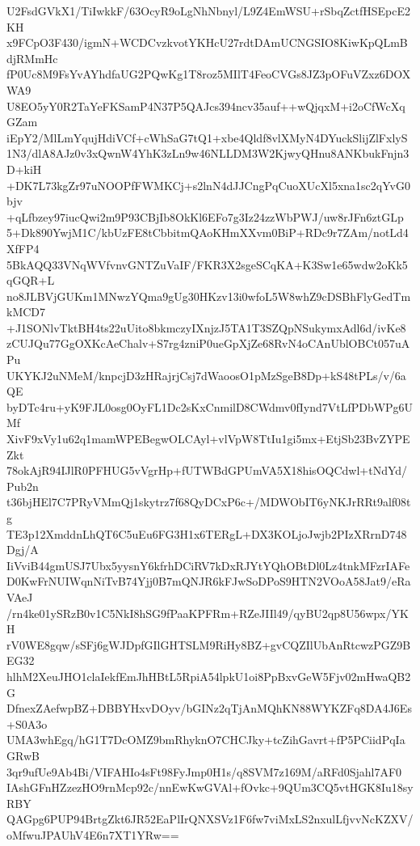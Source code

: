 U2FsdGVkX1/TiIwkkF/63OcyR9oLgNhNbnyl/L9Z4EmWSU+rSbqZctfHSEpcE2KH
x9FCpO3F430/igmN+WCDCvzkvotYKHcU27rdtDAmUCNGSIO8KiwKpQLmBdjRMmHc
fP0Uc8M9FsYvAYhdfaUG2PQwKg1T8roz5MIlT4FeoCVGs8JZ3pOFuVZxz6DOXWA9
U8EO5yY0R2TaYeFKSamP4N37P5QAJcs394ncv35auf++wQjqxM+i2oCfWcXqGZam
iEpY2/MlLmYqujHdiVCf+cWhSaG7tQ1+xbe4Qldf8vlXMyN4DYuckSlijZlFxlyS
1N3/dlA8AJz0v3xQwnW4YhK3zLn9w46NLLDM3W2KjwyQHnu8ANKbukFnjn3D+kiH
+DK7L73kgZr97uNOOPfFWMKCj+s2lnN4dJJCngPqCuoXUcXl5xna1sc2qYvG0bjv
+qLfbzey97iucQwi2m9P93CBjIb8OkKl6EFo7g3Iz24zzWbPWJ/uw8rJFn6ztGLp
5+Dk890YwjM1C/kbUzFE8tCbbitmQAoKHmXXvm0BiP+RDc9r7ZAm/notLd4XfFP4
5BkAQQ33VNqWVfvnvGNTZuVaIF/FKR3X2sgeSCqKA+K3Sw1e65wdw2oKk5qGQR+L
no8JLBVjGUKm1MNwzYQma9gUg30HKzv13i0wfoL5W8whZ9cDSBhFlyGedTmkMCD7
+J1SONlvTktBH4ts22uUito8bkmczyIXnjzJ5TA1T3SZQpNSukymxAdl6d/ivKe8
zCUJQu77GgOXKcAeChalv+S7rg4zniP0ueGpXjZe68RvN4oCAnUblOBCt057uAPu
UKYKJ2uNMeM/knpcjD3zHRajrjCsj7dWaoosO1pMzSgeB8Dp+kS48tPLs/v/6aQE
byDTc4ru+yK9FJL0osg0OyFL1Dc2sKxCnmilD8CWdmv0fIynd7VtLfPDbWPg6UMf
XivF9xVy1u62q1mamWPEBegwOLCAyl+vlVpW8TtIu1gi5mx+EtjSb23BvZYPEZkt
78okAjR94IJlR0PFHUG5vVgrHp+fUTWBdGPUmVA5X18hisOQCdwl+tNdYd/Pub2n
t36bjHEl7C7PRyVMmQj1skytrz7f68QyDCxP6c+/MDWObIT6yNKJrRRt9alf08tg
TE3p12XmddnLhQT6C5uEu6FG3H1x6TERgL+DX3KOLjoJwjb2PIzXRrnD748Dgj/A
IiVviB44gmUSJ7Ubx5yysnY6kfrhDCiRV7kDxRJYtYQhOBtDl0Lz4tnkMFzrIAFe
D0KwFrNUIWqnNiTvB74Yjj0B7mQNJR6kFJwSoDPoS9HTN2VOoA58Jat9/eRaVAeJ
/rn4ke01ySRzB0v1C5NkI8hSG9fPaaKPFRm+RZeJIIl49/qyBU2qp8U56wpx/YKH
rV0WE8gqw/sSFj6gWJDpfGIlGHTSLM9RiHy8BZ+gvCQZIlUbAnRtcwzPGZ9BEG32
hlhM2XeuJHO1claIekfEmJhHBtL5RpiA54lpkU1oi8PpBxvGeW5Fjv02mHwaQB2G
DfnexZAefwpBZ+DBBYHxvDOyv/bGINz2qTjAnMQhKN88WYKZFq8DA4J6Es+S0A3o
UMA3whEgq/hG1T7DcOMZ9bmRhyknO7CHCJky+tcZihGavrt+fP5PCiidPqIaGRwB
3qr9ufUe9Ab4Bi/VIFAHIo4sFt98FyJmp0H1s/q8SVM7z169M/aRFd0Sjahl7AF0
IAshGFnHZzezHO9rnMcp92c/nnEwKwGVAl+fOvkc+9QUm3CQ5vtHGK8Iu18syRBY
QAGpg6PUP94BrtgZkt6JR52EaPlIrQNXSVz1F6fw7viMxLS2nxulLfjvvNcKZXV/
oMfwuJPAUhV4E6n7XT1YRw==
